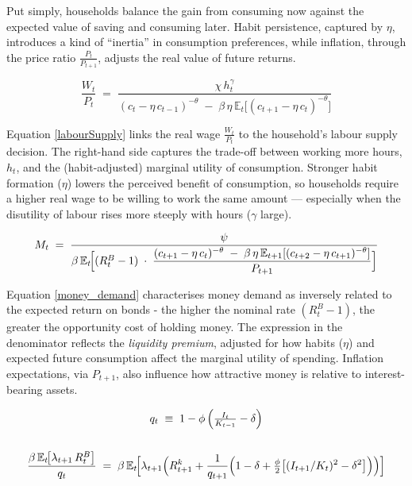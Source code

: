 \documentclass[11pt,preprint]{elsarticle}
\numberwithin{equation}{section}
\numberwithin{figure}{section}
\numberwithin{table}{section}
\begin{document}
Put simply, households balance the gain from consuming now against the
expected value of saving and consuming later. Habit persistence,
captured by \(\eta\), introduces a kind of ``inertia'' in consumption
preferences, while inflation, through the price ratio
\(\frac{P_t}{P_{t+1}}\), adjusts the real value of future returns.

\begin{equation}\label{labourSupply}
  \frac{W_t}{P_t}
  \;=\;
  \frac{\chi\,h_t^{\gamma}}
       {(c_t - \eta\,c_{t-1})^{-\theta}
        \;-\;
        \beta\,\eta\,\mathbb{E}_t\!\bigl[(c_{t+1} - \eta\,c_t)^{-\theta}\bigr]}
\end{equation}

Equation \ref{labourSupply} links the real wage \(\frac{W_t}{P_t}\) to
the household's labour supply decision. The right-hand side captures the
trade-off between working more hours, \(h_t\), and the (habit-adjusted)
marginal utility of consumption. Stronger habit formation (\(\eta\))
lowers the perceived benefit of consumption, so households require a
higher real wage to be willing to work the same amount --- especially
when the disutility of labour rises more steeply with hours (\(\gamma\)
large).

\begin{equation}\label{money_demand}
  M_t
  \;=\;
  \frac{\psi}
       {\beta\,\mathbb{E}_t\!\Bigl[
         (R_t^B - 1)
         \;\cdot\;
         \dfrac{(c_{t+1} - \eta\,c_t)^{-\theta}
               \;-\;
               \beta\,\eta\,\mathbb{E}_{t+1}[(c_{t+2} - \eta\,c_{t+1})^{-\theta}]}
              {P_{t+1}}
       \Bigr]}
\end{equation}

Equation \ref{money_demand} characterises money demand as inversely
related to the expected return on bonds - the higher the nominal rate
\((R_t^B - 1)\), the greater the opportunity cost of holding money. The
expression in the denominator reflects the \emph{liquidity premium},
adjusted for how habits (\(\eta\)) and expected future consumption
affect the marginal utility of spending. Inflation expectations, via
\(P_{t+1}\), also influence how attractive money is relative to
interest-bearing assets.

\begin{equation}\label{capital_euler}
  \begin{gathered}
  q_t \;\equiv\; 1 - \phi\,\Bigl(\tfrac{I_t}{K_{t-1}} - \delta\Bigr) \\
  \\
  \frac{\beta\,\mathbb{E}_t\!\bigl[\lambda_{t+1}\,R_t^B\bigr]}{q_t}
  \;=\;
  \beta\,\mathbb{E}_t\!\Bigl[
    \lambda_{t+1}\Bigl(
      R_{t+1}^k
      + \frac{1}{q_{t+1}}
        \Bigl(
          1 - \delta
          + \tfrac{\phi}{2}\bigl[(I_{t+1}/K_t)^2 - \delta^2\bigr]
        \Bigr)
    \Bigr)
  \Bigr]
  \end{gathered}
\end{equation}
\end{document}
